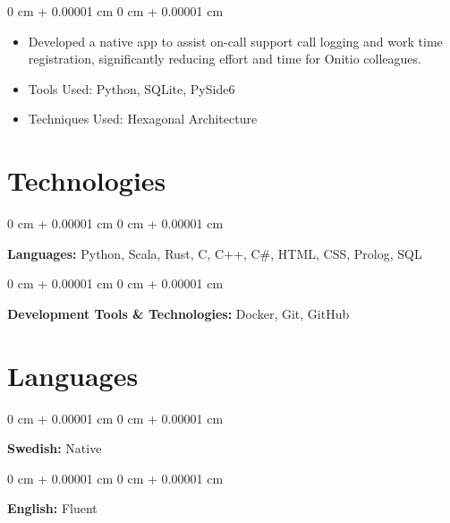 \documentclass[10pt, letterpaper]{article}
\newenvironment{highlights}{
    \begin{itemize}[
        topsep=0.10 cm,
        parsep=0.10 cm,
        partopsep=0pt,
        itemsep=0pt,
        leftmargin=0 cm + 10pt
    ]
}{
    \end{itemize}
} %
\newenvironment{onecolentry}{
    \begin{adjustwidth}{
        0 cm + 0.00001 cm
    }{
        0 cm + 0.00001 cm
    }
}{
    \end{adjustwidth}
} %
\begin{document}
        \vspace{0.10 cm}
        \begin{onecolentry}
            \begin{highlights}
                \item Developed a native app to assist on-call support call logging and work time registration, significantly reducing effort and time for Onitio colleagues.
                \item Tools Used: Python, SQLite, PySide6
                \item Techniques Used: Hexagonal Architecture
            \end{highlights}
        \end{onecolentry}



    
    \section{Technologies}



        
        \begin{onecolentry}
            \textbf{Languages:} Python, Scala, Rust, C, C++, C\#, HTML, CSS, Prolog, SQL
        \end{onecolentry}

        \vspace{0.2 cm}

        \begin{onecolentry}
            \textbf{Development Tools \& Technologies:} Docker, Git, GitHub
        \end{onecolentry}


    
    \section{Languages}



        
        \begin{onecolentry}
            \textbf{Swedish:} Native
        \end{onecolentry}

        \vspace{0.2 cm}

        \begin{onecolentry}
            \textbf{English:} Fluent
        \end{onecolentry}


    
\end{document}
